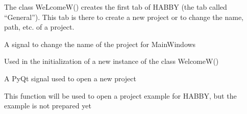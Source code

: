 \documentclass[letterpaper,10pt,english]{sphinxmanual}
\begin{document}
\begin{fulllineitems}
\label{\detokenize{index:src_GUI.Main_windows_1.WelcomeW}}
The class WeLcomeW()  creates the first tab of HABBY (the tab called “General”). This tab is there to create
a new project or to change the name, path, etc. of a project.

\begin{fulllineitems}
\label{\detokenize{index:src_GUI.Main_windows_1.WelcomeW.change_name}}
A signal to change the name of the project for MainWindows

\end{fulllineitems}


\begin{fulllineitems}
\label{\detokenize{index:src_GUI.Main_windows_1.WelcomeW.init_iu}}
Used in the initialization of a new instance of the class WelcomeW()

\end{fulllineitems}


\begin{fulllineitems}
\label{\detokenize{index:src_GUI.Main_windows_1.WelcomeW.new_proj_signal}}
A PyQt signal used to open a new project

\end{fulllineitems}


\begin{fulllineitems}
\label{\detokenize{index:src_GUI.Main_windows_1.WelcomeW.open_example}}
This function will be used to open a project example for HABBY, but the example is not prepared yet

\end{fulllineitems}



\end{fulllineitems}
\end{document}
